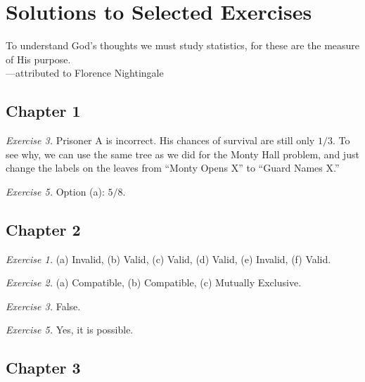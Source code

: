 \documentclass[justified]{tufte-book}
\newenvironment{epigraph}%
{
\begin{flushright}    
\begin{minipage}{20em}
\begin{flushright}
\itshape
}%
{
\end{flushright}
\end{minipage}
\end{flushright}
}
\theoremstyle{definition}
\theoremstyle{definition}
\theoremstyle{definition}
\theoremstyle{definition}
\theoremstyle{remark}
\begin{document}
\hypertarget{solutions-to-selected-exercises}{%
\chapter{Solutions to Selected Exercises}\label{solutions-to-selected-exercises}}

\begin{epigraph}
To understand God's thoughts we must study statistics, for these are the
measure of His purpose.\\
---attributed to Florence Nightingale
\end{epigraph}

\hypertarget{chapter-1}{%
\section*{Chapter 1}\label{chapter-1}}

\noindent
\emph{Exercise 3.} Prisoner A is incorrect. His chances of survival are still only \(1/3\). To see why, we can use the same tree as we did for the Monty Hall problem, and just change the labels on the leaves from ``Monty Opens X'' to ``Guard Names X.''

\vspace{.5em}\vspace{.5em}

\noindent
\emph{Exercise 5.} Option (a): \(5/8\).

\hypertarget{chapter-2}{%
\section*{Chapter 2}\label{chapter-2}}

\noindent
\emph{Exercise 1.} (a) Invalid, (b) Valid, (c) Valid, (d) Valid, (e) Invalid, (f) Valid.

\vspace{.5em}

\noindent
\emph{Exercise 2.} (a) Compatible, (b) Compatible, (c) Mutually Exclusive.

\vspace{.5em}

\noindent
\emph{Exercise 3.} False.

\vspace{.5em}

\noindent
\emph{Exercise 5.} Yes, it is possible.

\hypertarget{chapter-3}{%
\section*{Chapter 3}\label{chapter-3}}
\end{document}
